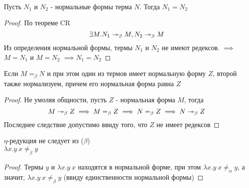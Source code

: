 \documentclass[lambda.tex]{subfiles}
\begin{document}
\begin{tcolorbox}
	\begin{corollary}
		~\\
		Пусть $N_1$ и $N_2$ - нормальные формы терма $N$. Тогда $N_1 = N_2$ 
	\end{corollary}
	\begin{proof}
		По теореме CR $$\exists M.N_1 \twoheadrightarrow_\beta M, N_2 \twoheadrightarrow_\beta M$$
		Из определения нормальной формы, термы $N_1$ и $N_2$ не имеют редексов.
		$\implies$ $M=N_1$ и $M=N_2$ $\implies N_1 = N_2$
	\end{proof}
	\begin{corollary}
		Если $M =_\beta N$ и при этом один из термов имеет нормальную форму $Z$, второй также нормализуем, причем его нормальная форма равна $Z$
	\end{corollary}
	\begin{proof}
		Не умоляя общности, пусть $Z$ - нормальная форма $M$, тогда 
		$$M \twoheadrightarrow_\beta Z \implies M =_\beta Z \implies N =_\beta Z \implies N \twoheadrightarrow_\beta Z$$
		Последнее следствие допустимо ввиду того, что $Z$ не имеет редексов
	\end{proof}
	\begin{corollary}
		$\eta$-редукция не следует из ($\beta$)
		~\\
		$\lambda x.y\ x \neq_\beta y$
	\end{corollary}
	\begin{proof}
		Термы $y$ и $\lambda x.y\ x$ находятся в нормальной форме, при этом $\lambda x.y\ x \neq_\alpha y$, а значит, $\lambda x.y\ x \neq_\beta y$ (ввиду единственности нормальной формы)
	\end{proof}
\end{tcolorbox}
\end{document}
